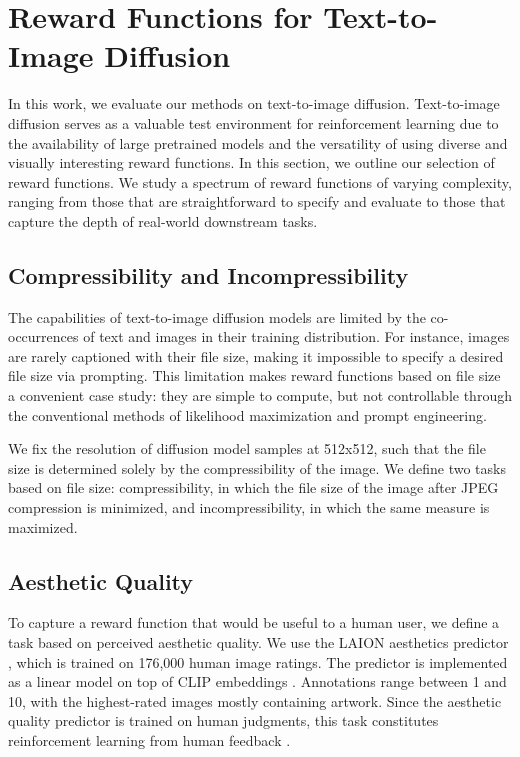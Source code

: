 \section{Reward Functions for Text-to-Image Diffusion}
\label{sec:reward_functions}


In this work, we evaluate our methods on text-to-image diffusion.
Text-to-image diffusion serves as a valuable test environment for reinforcement learning due to the availability of large pretrained models and the versatility of using diverse and visually interesting reward functions. In this section, we outline our selection of reward functions.
We study a spectrum of reward functions of varying complexity, ranging from those that are straightforward to specify and evaluate to those that capture the depth of real-world downstream tasks.

\subsection{Compressibility and Incompressibility}

The capabilities of text-to-image diffusion models are limited by the co-occurrences of text and images in their training distribution. For instance, images are rarely captioned with their file size, making it impossible to specify a desired file size via prompting.
This limitation makes reward functions based on file size a convenient case study: they are simple to compute, but not controllable through the conventional methods of likelihood maximization and prompt engineering.

We fix the resolution of diffusion model samples at 512x512, such that the file size is determined solely by the compressibility of the image. We define two tasks based on file size: compressibility, in which the file size of the image after JPEG compression is minimized, and incompressibility, in which the same measure is maximized.

\subsection{Aesthetic Quality}
To capture a reward function that would be useful to a human user, we define a task based on perceived aesthetic quality.
We use the LAION aesthetics predictor \citep{schuhmann2022laion}, which is trained on 176,000 human image ratings.
The predictor is implemented as a linear model on top of CLIP embeddings \citep{radford2021clip}.
Annotations range between 1 and 10, with the highest-rated images mostly containing artwork.
Since the aesthetic quality predictor is trained on human judgments, this task constitutes reinforcement learning from human feedback \citep{ouyang2022instructgpt,christiano2017rlhf,ziegler2019rlhf}. 


